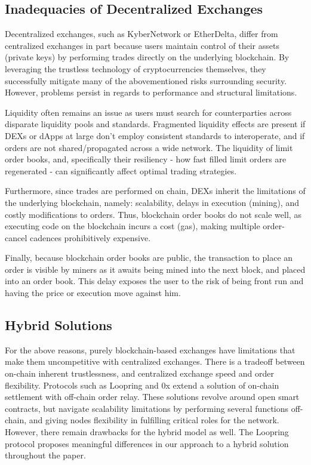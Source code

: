 \documentclass[UTF8,nofonts]{article}
\begin{document}
\subsection{Inadequacies of Decentralized Exchanges}
Decentralized exchanges, such as KyberNetwork or EtherDelta, differ from centralized exchanges in part because users maintain control of their assets (private keys) by performing trades directly on the underlying blockchain. By leveraging the trustless technology of cryptocurrencies themselves, they successfully mitigate many of the abovementioned risks surrounding security. However, problems persist in regards to performance and structural limitations. 

Liquidity often remains an issue as users must search for counterparties across disparate liquidity pools and standards. Fragmented liquidity effects are present if DEXs or dApps at large don't employ consistent standards to interoperate, and if orders are not shared/propagated across a wide network. The liquidity of limit order books, and, specifically their resiliency - how fast filled limit orders are regenerated - can significantly affect optimal trading strategies.\cite{limitorderliquidity}

Furthermore, since trades are performed on chain, DEXs inherit the limitations of the underlying blockchain, namely: scalability, delays in execution (mining), and costly modifications to orders. Thus, blockchain order books do not scale well, as executing code on the blockchain incurs a cost (gas), making multiple order-cancel cadences prohibitively expensive. 

Finally, because blockchain order books are public, the transaction to place an order is visible by miners as it awaits being mined into the next block, and placed into an order book. This delay exposes the user to the risk of being front run and having the price or execution move against him.

\subsection{Hybrid Solutions}
For the above reasons, purely blockchain-based exchanges have limitations that make them uncompetitive with centralized exchanges. There is a tradeoff between on-chain inherent trustlessness, and centralized exchange speed and order flexibility. Protocols such as Loopring and 0x \cite{warren20170x} extend a solution of on-chain settlement with off-chain order relay. These solutions revolve around open smart contracts, but navigate scalability limitations by performing several functions off-chain, and giving nodes flexibility in fulfilling critical roles for the network. However, there remain drawbacks\cite{costofdecent} for the hybrid model as well. The Loopring protocol proposes meaningful differences in our approach to a hybrid solution throughout the paper.
\end{document}
